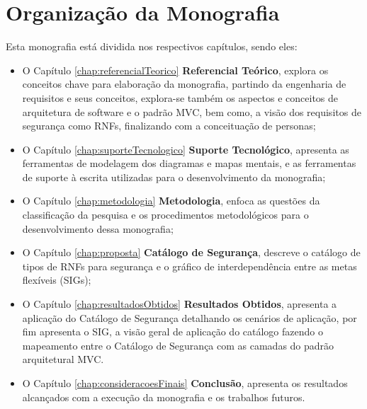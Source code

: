 \section{Organização da Monografia}

Esta monografia está dividida nos respectivos capítulos, sendo eles: 
\begin{itemize}
	\item O Capítulo \ref{chap:referencialTeorico} \textbf{Referencial Teórico}, explora os conceitos chave para elaboração da monografia, partindo da engenharia de requisitos e seus conceitos, explora-se também os aspectos e conceitos de arquitetura de software e o padrão MVC, bem como, a visão dos requisitos de segurança como RNFs, finalizando com a conceituação de personas;
	
	\item  O Capítulo \ref{chap:suporteTecnologico} \textbf{Suporte Tecnológico}, apresenta as ferramentas de modelagem dos diagramas e mapas mentais, e as ferramentas de suporte à escrita utilizadas para o desenvolvimento da monografia;
	
	\item O Capítulo \ref{chap:metodologia} \textbf{Metodologia}, enfoca as questões da classificação da pesquisa e os procedimentos metodológicos para o desenvolvimento dessa monografia;
	
	\item O Capítulo \ref{chap:proposta} \textbf{Catálogo de Segurança}, descreve o catálogo de tipos de RNFs para segurança e o gráfico de interdependência entre as metas flexíveis (SIGs);
	
	\item  O Capítulo  \ref{chap:resultadosObtidos} \textbf{Resultados Obtidos}, apresenta a aplicação do Catálogo de Segurança detalhando os cenários de aplicação, por fim apresenta o SIG, a visão geral de aplicação do catálogo fazendo o mapeamento entre o Catálogo de Segurança com as camadas do padrão arquitetural MVC. 
	
	\item  O Capítulo \ref{chap:consideracoesFinais} \textbf{Conclusão}, apresenta os resultados alcançados com a execução da monografia e os trabalhos futuros. 
\end{itemize}

